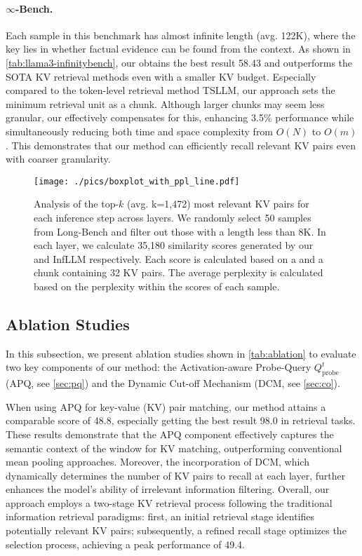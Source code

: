  
 \vspace{-0.5em}
\paragraph{$\infty$-Bench.} Each sample in this benchmark has almost infinite length (avg. 122K), where the key lies in whether factual evidence can be found from the context. As shown in \cref{tab:llama3-infinitybench}, our \name obtains the best result 58.43 and outperforms the SOTA KV retrieval methods even with a smaller KV budget. Especially compared to the token-level retrieval method TSLLM, our approach sets the minimum retrieval unit as a chunk. Although larger chunks may seem less granular, our \pq effectively compensates for this, enhancing 3.5\% performance while simultaneously reducing both time and space complexity from $O(N)$ to $O(m)$. This demonstrates that our method can efficiently recall relevant KV pairs even with coarser granularity.



\begin{figure*}[!ht] 
\vspace{-0.5em}
    \centering
        \texttt{[image: ./pics/boxplot\_with\_ppl\_line.pdf]}
    \caption{Analysis of the top-$k$  (avg. k=1,472) most relevant KV pairs for each inference step across layers. We randomly select 50 samples from Long-Bench and filter out those with a length less than 8K. In each layer, we calculate 35,180 similarity scores generated by our \name and InfLLM respectively. Each score is calculated based on a \pq and a chunk containing 32 KV pairs. The average perplexity is calculated based on the perplexity within the scores of each sample.
    } 
    \label{fig:analysis}
\end{figure*}

\subsection{Ablation Studies}
\label{sec:ablation}
In this subsection, we present ablation studies shown in \cref{tab:ablation} to evaluate two key components of our method: the Activation-aware Probe-Query $Q_\text{probe}^t$ (APQ, see \cref{sec:pq}) and the Dynamic Cut-off Mechanism (DCM, see \cref{sec:co}). 

When using APQ for key-value (KV) pair matching, our method attains a comparable score of 48.8, especially getting the best result 98.0 in retrieval tasks. These results demonstrate that the APQ component effectively captures the semantic context of the window for KV matching, outperforming conventional mean pooling approaches. Moreover, the incorporation of DCM, which dynamically determines the number of KV pairs to recall at each layer, further enhances the model’s ability of irrelevant information filtering. Overall, our approach employs a two-stage KV retrieval process following the traditional information retrieval paradigms: first, an initial retrieval stage identifies potentially relevant KV pairs; subsequently, a refined recall stage optimizes the selection process, achieving a peak performance of 49.4.

